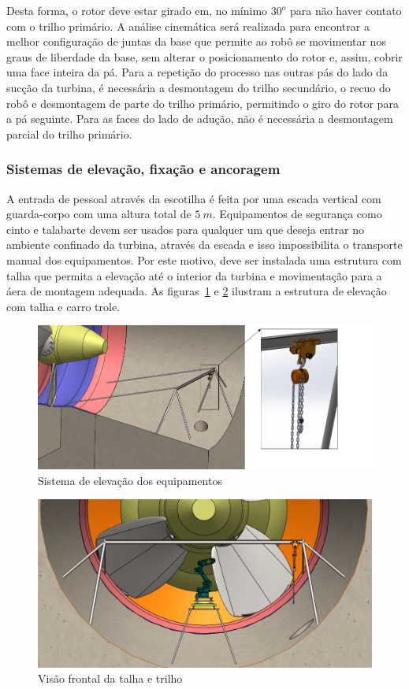   Desta forma, o rotor deve estar girado em, no mínimo $30^o$ para não haver
  contato com o trilho primário. A análise cinemática será realizada para
  encontrar a melhor configuração de juntas da base que permite ao robô se
  movimentar nos graus de liberdade da base, sem alterar o posicionamento do
  rotor e, assim, cobrir uma face inteira da pá. Para a repetição do processo
  nas outras pás do lado da sucção da turbina, é necessária a desmontagem do
  trilho secundário, o recuo do robô e desmontagem de parte do trilho primário,
  permitindo o giro do rotor para a pá seguinte.
  Para as faces do lado de adução, não é necessária a desmontagem parcial do
  trilho primário.
  
\subsubsection{Sistemas de elevação, fixação e ancoragem}
A entrada de pessoal através da escotilha é feita por uma escada vertical com
guarda-corpo com uma altura total de $5~m$. Equipamentos de segurança como
cinto e talabarte devem ser usados para qualquer um que deseja entrar no
ambiente confinado da turbina, através da escada e isso impossibilita o
transporte manual dos equipamentos. Por este motivo, deve ser instalada uma
estrutura com talha que permita a elevação até o interior da turbina e
movimentação para a áera de montagem adequada. As figuras~\ref{fig::talha} e
\ref{fig::talha_trilho} ilustram a estrutura de elevação com talha e carro
trole. 
  
\begin{figure}[h!]
   \centering
   \includegraphics[width=0.8\columnwidth]{figs/bases/talha}
   \caption{Sistema de elevação dos equipamentos}
   \label{fig::talha}
\end{figure}

\begin{figure}[h!]
   \centering
   \includegraphics[width=0.8\columnwidth]{figs/bases/talha_trilho}
   \caption{Visão frontal da talha e trilho}
   \label{fig::talha_trilho}
\end{figure}

